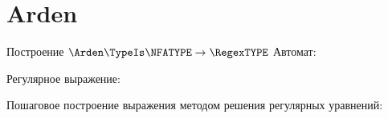\section{Arden}
\begin{frame}{Построение $\Arden\TypeIs\NFATYPE\to\RegexTYPE$}
	Автомат:


	Регулярное выражение:

	Пошаговое построение выражения методом решения регулярных уравнений:


\end{frame}
